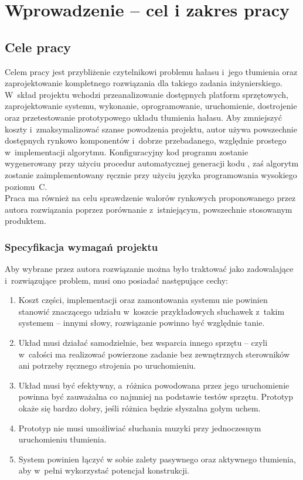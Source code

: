 \chapter{Wprowadzenie -- cel i zakres pracy}
\label{cha:intro}

\section{Cele pracy}
\label{sec:celePracy}
Celem pracy jest przybliżenie czytelnikowi problemu hałasu i~jego tłumienia oraz  zaprojektowanie kompletnego rozwiązania dla takiego zadania inżynierskiego. W~skład projektu wchodzi przeanalizowanie dostępnych platform sprzętowych, zaprojektowanie systemu, wykonanie, oprogramowanie, uruchomienie, dostrojenie oraz przetestowanie prototypowego układu tłumienia hałasu. Aby zmniejszyć koszty i~zmaksymalizować szanse powodzenia projektu, autor używa powszechnie dostępnych rynkowo komponentów i~dobrze przebadanego, względnie prostego w~implementacji algorytmu. Konfiguracyjny kod programu zostanie wygenerowany przy użyciu procedur automatycznej generacji kodu%
, zaś algorytm zostanie zaimplementowany ręcznie przy użyciu języka programowania wysokiego poziomu~C.\\
Praca ma również na celu sprawdzenie walorów rynkowych proponowanego przez autora rozwiązania poprzez porównanie z~istniejącym, powszechnie stosowanym produktem.
\subsection{Specyfikacja wymagań projektu}
Aby wybrane przez autora rozwiązanie można było traktować jako zadowalające i~rozwiązujące problem, musi ono posiadać następujące cechy:
\begin{enumerate}
	\item Koszt części, implementacji oraz zamontowania systemu nie powinien stanowić znaczącego udziału w~koszcie przykładowych słuchawek z~takim systemem -- innymi słowy, rozwiązanie powinno być względnie tanie.
	\item Układ musi działać samodzielnie, bez wsparcia innego sprzętu -- czyli w~całości ma realizować powierzone zadanie bez zewnętrznych sterowników ani potrzeby ręcznego strojenia po uruchomieniu.
	\item Układ musi być efektywny, a~różnica powodowana przez jego uruchomienie powinna być zauważalna co najmniej na podstawie testów sprzętu. Prototyp okaże się bardzo dobry, jeśli różnica będzie słyszalna gołym uchem.
	\item Prototyp nie musi umożliwiać słuchania muzyki przy jednoczesnym uruchomieniu tłumienia.
	\item System powinien łączyć w sobie zalety pasywnego oraz aktywnego tłumienia, aby w~pełni wykorzystać potencjał konstrukcji.
\end{enumerate}
